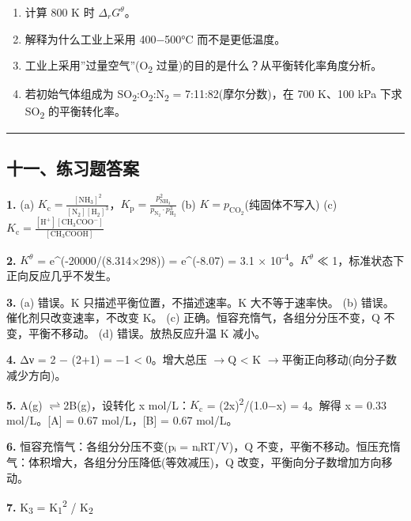 \documentclass[a4paper,11pt]{ctexart}
\providecommand{\tightlist}{\setlength{\itemsep}{0pt}\setlength{\parskip}{0pt}}
\newcommand{\箭}{\ensuremath{\rightarrow}}
\newcommand{\左箭}{\ensuremath{\leftarrow}}
\newcommand{\上箭}{\ensuremath{\uparrow}}
\newcommand{\下箭}{\ensuremath{\downarrow}}
\newcommand{\衡}{\ensuremath{\rightleftharpoons}}
\newcommand{\双箭}{\ensuremath{\leftrightarrow}}
\newcommand{\约等于}{\ensuremath{\approx}}
\newcommand{\小于等于}{\ensuremath{\leq}}
\newcommand{\大于等于}{\ensuremath{\geq}}
\newcommand{\不等于}{\ensuremath{\neq}}
\newcommand{\西格马}{\ensuremath{\sigma}}
\newcommand{\派}{\ensuremath{\pi}}
\begin{document}
\begin{enumerate}
\def\labelenumi{(\alph{enumi})}
\tightlist
\item
  计算 800 K 时 \(\Delta_r G^\theta\)。
\item
  解释为什么工业上采用 400−500°C 而不是更低温度。
\item
  工业上采用''过量空气''(O\textsubscript{2} 过量)的目的是什么？从平衡转化率角度分析。
\item
  若初始气体组成为 SO\textsubscript{2}:O\textsubscript{2}:N\textsubscript{2} = 7:11:82(摩尔分数)，在 700 K、100 kPa 下求 SO\textsubscript{2} 的平衡转化率。
\end{enumerate}

\begin{center}\rule{0.5\linewidth}{0.5pt}\end{center}

\subsection{十一、练习题答案}\label{ux5341ux4e00ux7ec3ux4e60ux9898ux7b54ux6848}

\textbf{1.}
(a) \(K_{\mathrm c} = \frac{[\mathrm{NH_3}]^2}{[\mathrm{N_2}][\mathrm{H_2}]^3}\)，\(K_{\mathrm p} = \frac{p_{\mathrm{NH_3}}^2}{p_{\mathrm{N_2}} \cdot p_{\mathrm{H_2}}^3}\)
(b) \(K = p_{\mathrm{CO_2}}\)(纯固体不写入)
(c) \(K_{\mathrm c} = \frac{[\mathrm{H^+}][\mathrm{CH_3COO^-}]}{[\mathrm{CH_3COOH}]}\)

\textbf{2.} \(K^\theta\) = e\^{}(-20000/(8.314×298)) = e\^{}(-8.07) = 3.1 × 10\textsuperscript{-4}。\(K^\theta\) ≪ 1，标准状态下正向反应几乎不发生。

\textbf{3.}
(a) 错误。K 只描述平衡位置，不描述速率。K 大不等于速率快。
(b) 错误。催化剂只改变速率，不改变 K。
(c) 正确。恒容充惰气，各组分分压不变，Q 不变，平衡不移动。
(d) 错误。放热反应升温 K 减小。

\textbf{4.} Δν = 2 − (2+1) = −1 \textless{} 0。增大总压 \箭 Q \textless{} K \箭 平衡正向移动(向分子数减少方向)。

\textbf{5.} A(g) \衡 2B(g)，设转化 x mol/L：\(K_{\mathrm c}\) = (2x)\textsuperscript{2}/(1.0−x) = 4。解得 x = 0.33 mol/L。{[}A{]} = 0.67 mol/L，{[}B{]} = 0.67 mol/L。

\textbf{6.} 恒容充惰气：各组分分压不变(pᵢ = nᵢRT/V)，Q 不变，平衡不移动。恒压充惰气：体积增大，各组分分压降低(等效减压)，Q 改变，平衡向分子数增加方向移动。

\textbf{7.} K\textsubscript{3} = K\textsubscript{1}\textsuperscript{2} / K\textsubscript{2}
\end{document}
